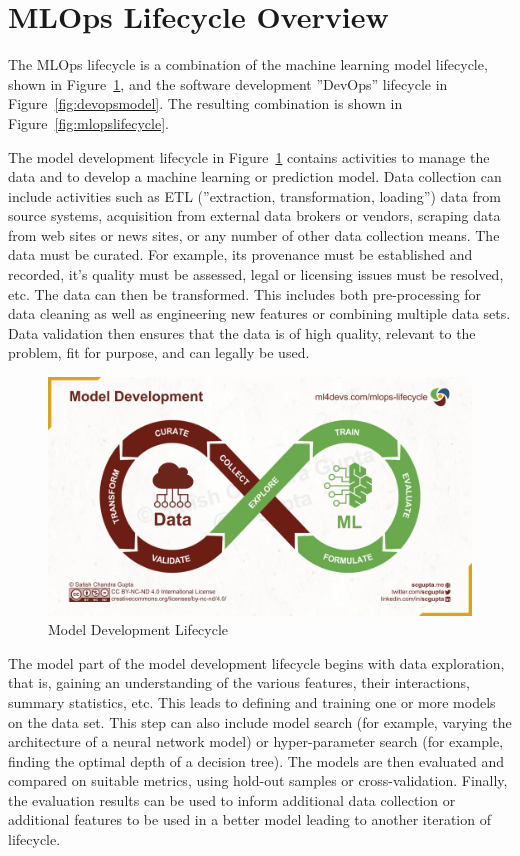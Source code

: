 \section{MLOps Lifecycle Overview}

The MLOps lifecycle is a combination of the machine learning model lifecycle, shown in Figure~\ref{fig:modellifecycle}, and the software development ''DevOps'' lifecycle in Figure~\ref{fig:devopsmodel}. The resulting combination is shown in Figure~\ref{fig:mlopslifecycle}. 

The model development lifecycle in Figure~\ref{fig:modellifecycle} contains activities to manage the data and to develop a machine learning or prediction model. Data collection can include activities such as ETL (''extraction, transformation, loading'') data from source systems, acquisition from external data brokers or vendors, scraping data from web sites or news sites, or any number of other data collection means. The data must be curated. For example, its provenance must be established and recorded, it's quality must be assessed, legal or licensing issues must be resolved, etc. The data can then be transformed. This includes both pre-processing for data cleaning as well as engineering new features or combining multiple data sets. Data validation then ensures that the data is of high quality, relevant to the problem, fit for purpose, and can legally be used. 

\begin{figure}[h]
\centering
\includegraphics[width=.8\textwidth]{mlmodel.jpeg}
\caption{Model Development Lifecycle}
\label{fig:modellifecycle}
\end{figure}

The model part of the model development lifecycle begins with data exploration, that is, gaining an understanding of the various features, their interactions, summary statistics, etc. This leads to defining and training one or more models on the data set. This step can also include model search (for example, varying the architecture of a neural network model) or hyper-parameter search (for example, finding the optimal depth of a decision tree). The models are then evaluated and compared on suitable metrics, using hold-out samples or cross-validation. Finally, the evaluation results can be used to inform additional data collection or additional features to be used in a better model leading to another iteration of lifecycle.

